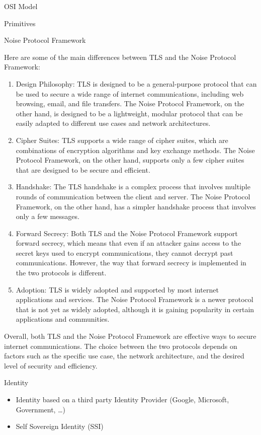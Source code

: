 \begin{frame}[fragile]{OSI Model}
\begin{block}{Primitives}
\begin{block}{Noise Protocol Framework}
\begin{description}
Here are some of the main differences between TLS and the Noise Protocol
Framework:

\begin{enumerate}
\tightlist
\item
  Design Philosophy: TLS is designed to be a general-purpose protocol
  that can be used to secure a wide range of internet communications,
  including web browsing, email, and file transfers. The Noise Protocol
  Framework, on the other hand, is designed to be a lightweight, modular
  protocol that can be easily adapted to different use cases and network
  architectures.
\item
  Cipher Suites: TLS supports a wide range of cipher suites, which are
  combinations of encryption algorithms and key exchange methods. The
  Noise Protocol Framework, on the other hand, supports only a few
  cipher suites that are designed to be secure and efficient.
\item
  Handshake: The TLS handshake is a complex process that involves
  multiple rounds of communication between the client and server. The
  Noise Protocol Framework, on the other hand, has a simpler handshake
  process that involves only a few messages.
\item
  Forward Secrecy: Both TLS and the Noise Protocol Framework support
  forward secrecy, which means that even if an attacker gains access to
  the secret keys used to encrypt communications, they cannot decrypt
  past communications. However, the way that forward secrecy is
  implemented in the two protocols is different.
\item
  Adoption: TLS is widely adopted and supported by most internet
  applications and services. The Noise Protocol Framework is a newer
  protocol that is not yet as widely adopted, although it is gaining
  popularity in certain applications and communities.
\end{enumerate}

Overall, both TLS and the Noise Protocol Framework are effective ways to
secure internet communications. The choice between the two protocols
depends on factors such as the specific use case, the network
architecture, and the desired level of security and efficiency.
\end{description}
\end{block}

\begin{block}{Identity}
\protect\hypertarget{identity}{}
\begin{itemize}
\tightlist
\item
  Identity based on a third party Identity Provider (Google, Microsoft,
  Government, \ldots)
\item
  Self Sovereign Identity (SSI)
\end{itemize}
\end{block}
\end{block}


\end{frame}
